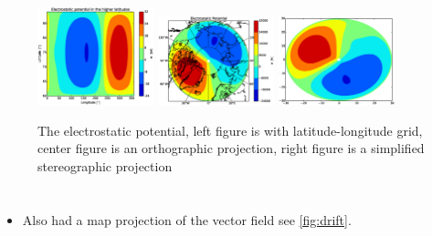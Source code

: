\documentclass[x11names]{article}
\begin{document}
    \begin{figure}
      \centering
      \includegraphics[width = 0.30\textwidth]{potential}
      \includegraphics[width = 0.30\textwidth]{map_potential}
      \includegraphics[width = 0.30\textwidth]{other_proj}
      \caption{The electrostatic potential, left figure is with latitude-longitude grid, center figure is an orthographic projection, right figure is a simplified stereographic projection}
      \label{fig:potential}
    \end{figure}

  \section{}
    \begin{itemize}
      \item Also had a map projection of the vector field see \cref{fig:drift}.
    \end{itemize}
\end{document}
